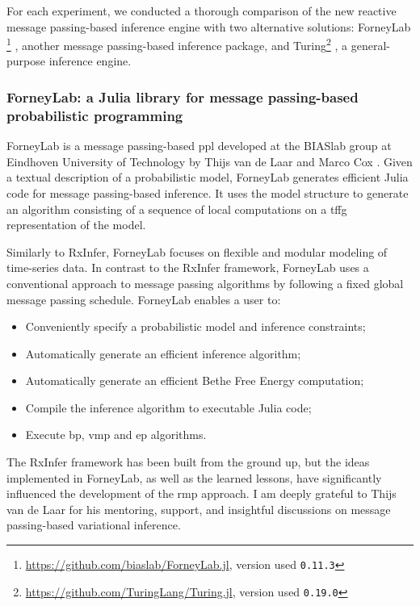 For each experiment, we conducted a thorough comparison of the new reactive message
passing-based inference engine with two alternative solutions:
ForneyLab \footnote{\url{https://github.com/biaslab/ForneyLab.jl}, version used \texttt{0.11.3}} \citep{van_de_laar_forneylab.jl:_2018}, another message
passing-based inference package, and Turing\footnote{\url{https://github.com/TuringLang/Turing.jl}, version used \texttt{0.19.0}} \citep{ge_turing_2018}, a general-purpose inference engine.

\subsubsection{ForneyLab: a Julia library for message passing-based probabilistic programming}

ForneyLab is a message passing-based \ac{ppl} developed at the BIASlab group at Eindhoven University of Technology by Thijs van de Laar and Marco Cox \citep{cox_factor_2019}. Given a textual description of a probabilistic model, ForneyLab generates efficient Julia code for message passing-based inference. It uses the model structure to generate an algorithm consisting of a sequence of local computations on a \ac{tffg} representation of the model. 

Similarly to RxInfer, ForneyLab focuses on flexible and modular modeling of time-series data. In contrast to the RxInfer framework, ForneyLab uses a conventional approach to message passing algorithms by following a fixed global message passing schedule. ForneyLab enables a user to:
\begin{itemize}
    \item Conveniently specify a probabilistic model and inference constraints;
    \item Automatically generate an efficient inference algorithm;
    \item Automatically generate an efficient Bethe Free Energy computation;
    \item Compile the inference algorithm to executable Julia code;
    \item Execute \ac{bp}, \ac{vmp} and \ac{ep} algorithms.
\end{itemize}

The RxInfer framework has been built from the ground up, but the ideas implemented in ForneyLab, as well as the learned lessons, have significantly influenced the development of the \ac{rmp} approach. I am deeply grateful to Thijs van de Laar for his mentoring, support, and insightful discussions on message passing-based variational inference.

